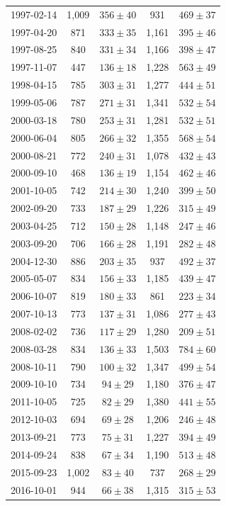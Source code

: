 \begin{longtable}{ccccc}
	{1997-02-14} & 1,009 & {$356  \pm  40$} & 931 & {$469  \pm  37$} \\
	{1997-04-20} & 871 & {$333  \pm  35$} & 1,161 & {$395  \pm  46$} \\
	{1997-08-25} & 840 & {$331  \pm  34$} & 1,166 & {$398  \pm  47$} \\
	{1997-11-07} & 447 & {$136  \pm  18$} & 1,228 & {$563  \pm  49$} \\
	{1998-04-15} & 785 & {$303  \pm  31$} & 1,277 & {$444  \pm  51$} \\
	{1999-05-06} & 787 & {$271  \pm  31$} & 1,341 & {$532  \pm  54$} \\
	{2000-03-18} & 780 & {$253  \pm  31$} & 1,281 & {$532  \pm  51$} \\
	{2000-06-04} & 805 & {$266  \pm  32$} & 1,355 & {$568  \pm  54$} \\
	{2000-08-21} & 772 & {$240  \pm  31$} & 1,078 & {$432  \pm  43$} \\
	{2000-09-10} & 468 & {$136  \pm  19$} & 1,154 & {$462  \pm  46$} \\
	{2001-10-05} & 742 & {$214  \pm  30$} & 1,240 & {$399  \pm  50$} \\
	{2002-09-20} & 733 & {$187  \pm  29$} & 1,226 & {$315  \pm  49$} \\
	{2003-04-25} & 712 & {$150  \pm  28$} & 1,148 & {$247  \pm  46$} \\
	{2003-09-20} & 706 & {$166  \pm  28$} & 1,191 & {$282  \pm  48$} \\
	{2004-12-30} & 886 & {$203  \pm  35$} & 937 & {$492  \pm  37$} \\
	{2005-05-07} & 834 & {$156  \pm  33$} & 1,185 & {$439  \pm  47$} \\
	{2006-10-07} & 819 & {$180  \pm  33$} & 861 & {$223  \pm  34$} \\
	{2007-10-13} & 773 & {$137  \pm  31$} & 1,086 & {$277  \pm  43$} \\
	{2008-02-02} & 736 & {$117  \pm  29$} & 1,280 & {$209  \pm  51$} \\
	{2008-03-28} & 834 & {$136  \pm  33$} & 1,503 & {$784  \pm  60$} \\
	{2008-10-11} & 790 & {$100  \pm  32$} & 1,347 & {$499  \pm  54$} \\
	{2009-10-10} & 734 & {$94  \pm  29$} & 1,180 & {$376  \pm  47$} \\
	{2011-10-05} & 725 & {$82  \pm  29$} & 1,380 & {$441  \pm  55$} \\
	{2012-10-03} & 694 & {$69  \pm  28$} & 1,206 & {$246  \pm  48$} \\
	{2013-09-21} & 773 & {$75  \pm  31$} & 1,227 & {$394  \pm  49$} \\
	{2014-09-24} & 838 & {$67  \pm  34$} & 1,190 & {$513  \pm  48$} \\
	{2015-09-23} & 1,002 & {$83  \pm  40$} & 737 & {$268  \pm  29$} \\
	{2016-10-01} & 944 & {$66  \pm  38$} & 1,315 & {$315  \pm  53$} \\
\end{longtable}

